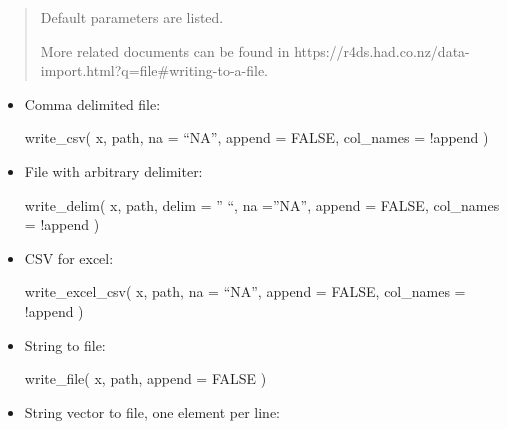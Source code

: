 \documentclass[
]{article}
\newenvironment{Shaded}{}{}
\newcommand{\AttributeTok}[1]{\textcolor[rgb]{0.49,0.56,0.16}{#1}}
\newcommand{\ConstantTok}[1]{\textcolor[rgb]{0.53,0.00,0.00}{#1}}
\newcommand{\FunctionTok}[1]{\textcolor[rgb]{0.02,0.16,0.49}{#1}}
\newcommand{\NormalTok}[1]{#1}
\newcommand{\SpecialCharTok}[1]{\textcolor[rgb]{0.25,0.44,0.63}{#1}}
\begin{document}
\begin{quote}
Default parameters are listed.

More related documents can be found in https://r4ds.had.co.nz/data-import.html?q=file\#writing-to-a-file.
\end{quote}

\begin{itemize}
\item
  Comma delimited file:

\begin{Shaded}
\begin{Highlighting}[]
\FunctionTok{write\_csv}\NormalTok{(}
\NormalTok{  x, }
\NormalTok{  path, }
  \AttributeTok{na =}\NormalTok{ “NA”, }
  \AttributeTok{append =} \ConstantTok{FALSE}\NormalTok{, }
  \AttributeTok{col\_names =} \SpecialCharTok{!}\NormalTok{append}
\NormalTok{) }
\end{Highlighting}
\end{Shaded}
\item
  File with arbitrary delimiter:

\begin{Shaded}
\begin{Highlighting}[]
\FunctionTok{write\_delim}\NormalTok{(}
\NormalTok{  x, }
\NormalTok{  path, }
  \AttributeTok{delim =}\NormalTok{ ” “, }
  \AttributeTok{na =}\NormalTok{”NA”, }
  \AttributeTok{append =} \ConstantTok{FALSE}\NormalTok{, }
  \AttributeTok{col\_names =} \SpecialCharTok{!}\NormalTok{append}
\NormalTok{)}
\end{Highlighting}
\end{Shaded}
\item
  CSV for excel:

\begin{Shaded}
\begin{Highlighting}[]
\FunctionTok{write\_excel\_csv}\NormalTok{(}
\NormalTok{  x, }
\NormalTok{  path, }
  \AttributeTok{na =}\NormalTok{ “NA”, }
  \AttributeTok{append =} \ConstantTok{FALSE}\NormalTok{,}
  \AttributeTok{col\_names =} \SpecialCharTok{!}\NormalTok{append}
\NormalTok{) }
\end{Highlighting}
\end{Shaded}
\item
  String to file:

\begin{Shaded}
\begin{Highlighting}[]
\FunctionTok{write\_file}\NormalTok{(}
\NormalTok{  x,}
\NormalTok{  path, }
  \AttributeTok{append =} \ConstantTok{FALSE}
\NormalTok{)}
\end{Highlighting}
\end{Shaded}
\item
  String vector to file, one element per line:


\end{itemize}
\end{document}
